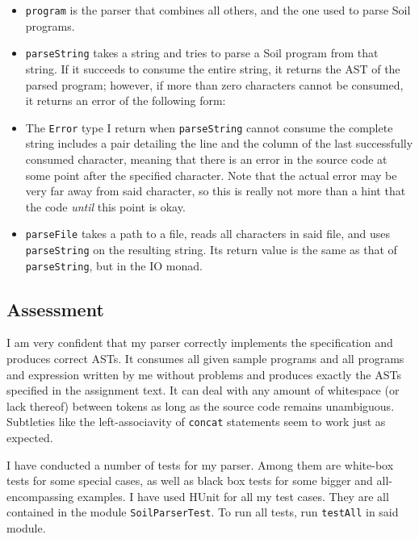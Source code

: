 \documentclass[a4paper]{article}
\begin{document}
\begin{itemize}
  \item \texttt{program} is the parser that combines all others, and the one used to parse Soil programs.
  \item \texttt{parseString} takes a string and tries to parse a Soil program from that string. If it succeeds to consume the entire string, it returns the AST of the parsed program; however, if more than zero characters cannot be consumed, it returns an error of the following form:
  \item The \texttt{Error} type I return when \texttt{parseString} cannot consume the complete string includes a pair detailing the line and the column of the last successfully consumed character, meaning that there is an error in the source code at some point after the specified character. Note that the actual error may be very far away from said character, so this is really not more than a hint that the code \emph{until} this point is okay.
  \item \texttt{parseFile} takes a path to a file, reads all characters in said file, and uses \texttt{parseString} on the resulting string. Its return value is the same as that of \texttt{parseString}, but in the IO monad.
\end{itemize}

\subsection*{Assessment}
I am very confident that my parser correctly implements the specification and produces correct ASTs. It consumes all given sample programs and all programs and expression written by me without problems and produces exactly the ASTs specified in the assignment text. It can deal with any amount of whitespace (or lack thereof) between tokens as long as the source code remains unambiguous. Subtleties like the left-associavity of \texttt{concat} statements seem to work just as expected. 

I have conducted a number of tests for my parser. Among them are white-box tests for some special cases, as well as black box tests for some bigger and all-encompassing examples. I have used HUnit for all my test cases. They are all contained in the module \texttt{SoilParserTest}. To run all tests, run \texttt{testAll} in said module.
\end{document}
